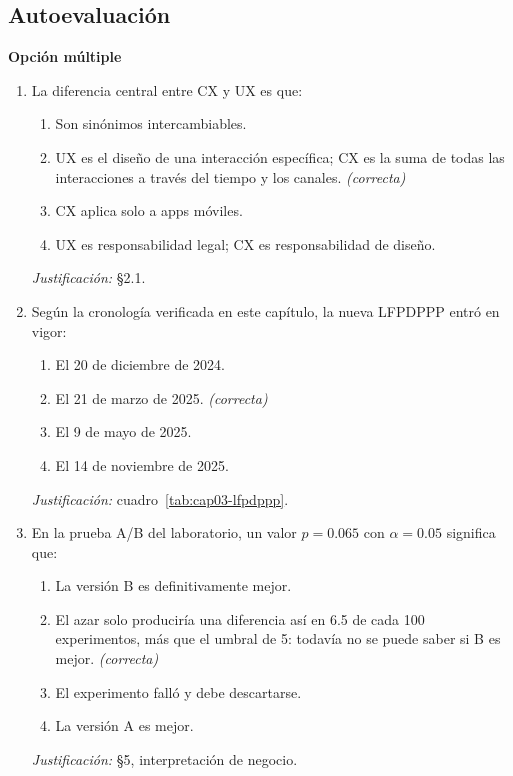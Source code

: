 \subsection*{Autoevaluación}

\textbf{Opción múltiple}

\begin{enumerate}
  \item La diferencia central entre CX y UX es que:
  \begin{enumerate}
    \item[a)] Son sinónimos intercambiables.
    \item[b)] UX es el diseño de una interacción específica; CX es la suma de todas las interacciones a través del tiempo y los canales. \textit{(correcta)}
    \item[c)] CX aplica solo a apps móviles.
    \item[d)] UX es responsabilidad legal; CX es responsabilidad de diseño.
  \end{enumerate}
  \textit{Justificación:} §2.1.

  \item Según la cronología verificada en este capítulo, la nueva LFPDPPP
  entró en vigor:
  \begin{enumerate}
    \item[a)] El 20 de diciembre de 2024.
    \item[b)] El 21 de marzo de 2025. \textit{(correcta)}
    \item[c)] El 9 de mayo de 2025.
    \item[d)] El 14 de noviembre de 2025.
  \end{enumerate}
  \textit{Justificación:} cuadro~\ref{tab:cap03-lfpdppp}.

  \item En la prueba A/B del laboratorio, un valor $p=0.065$ con
  $\alpha=0.05$ significa que:
  \begin{enumerate}
    \item[a)] La versión B es definitivamente mejor.
    \item[b)] El azar solo produciría una diferencia así en 6.5 de cada 100 experimentos, más que el umbral de 5: todavía no se puede saber si B es mejor. \textit{(correcta)}
    \item[c)] El experimento falló y debe descartarse.
    \item[d)] La versión A es mejor.
  \end{enumerate}
  \textit{Justificación:} §5, interpretación de negocio.
\end{enumerate}

